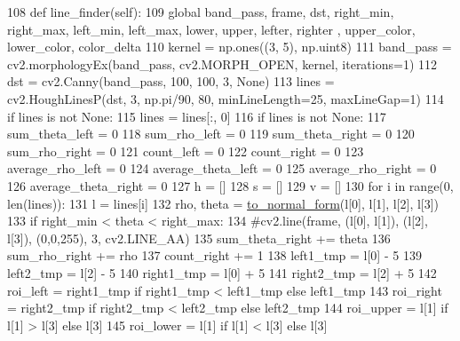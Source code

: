 \begin{DoxyCode}
108   \textcolor{keyword}{def }line\_finder(self):
109       \textcolor{keyword}{global} band\_pass, frame, dst, right\_min, right\_max, left\_min, left\_max, lower, upper, lefter, righter
      , upper\_color, lower\_color, color\_delta
110       kernel = np.ones((3, 5), np.uint8) 
111       band\_pass = cv2.morphologyEx(band\_pass, cv2.MORPH\_OPEN, kernel, iterations=1)
112       dst = cv2.Canny(band\_pass, 100, 100, 3, \textcolor{keywordtype}{None})
113       lines = cv2.HoughLinesP(dst, 3, np.pi/90, 80, minLineLength=25, maxLineGap=1)
114       \textcolor{keywordflow}{if} lines \textcolor{keywordflow}{is} \textcolor{keywordflow}{not} \textcolor{keywordtype}{None}:
115           lines = lines[:, 0]
116       \textcolor{keywordflow}{if} lines \textcolor{keywordflow}{is} \textcolor{keywordflow}{not} \textcolor{keywordtype}{None}:
117           sum\_theta\_left = 0
118           sum\_rho\_left = 0
119           sum\_theta\_right = 0
120           sum\_rho\_right = 0
121           count\_left = 0
122           count\_right = 0
123           average\_rho\_left = 0
124           average\_theta\_left = 0
125           average\_rho\_right = 0
126           average\_theta\_right = 0
127           h = []
128           s = []
129           v = []
130           \textcolor{keywordflow}{for} i \textcolor{keywordflow}{in} range(0, len(lines)):
131               l = lines[i]
132               rho, theta = \mbox{\hyperlink{namespacetoxic__vision_1_1lane__detector_ae3bdbfab97718df7c906f65d19f10dfd}{to\_normal\_form}}(l[0], l[1], l[2], l[3])
133               \textcolor{keywordflow}{if} right\_min < theta < right\_max:
134                   \textcolor{comment}{#cv2.line(frame, (l[0], l[1]), (l[2], l[3]), (0,0,255), 3, cv2.LINE\_AA)}
135                   sum\_theta\_right += theta
136                   sum\_rho\_right += rho
137                   count\_right += 1
138                   left1\_tmp = l[0] - 5
139                   left2\_tmp = l[2] - 5
140                   right1\_tmp = l[0] + 5
141                   right2\_tmp = l[2] + 5
142                   roi\_left = right1\_tmp \textcolor{keywordflow}{if} right1\_tmp < left1\_tmp \textcolor{keywordflow}{else} left1\_tmp
143                   roi\_right = right2\_tmp \textcolor{keywordflow}{if} right2\_tmp < left2\_tmp \textcolor{keywordflow}{else} left2\_tmp
144                   roi\_upper = l[1] \textcolor{keywordflow}{if} l[1] > l[3] \textcolor{keywordflow}{else} l[3]
145                   roi\_lower = l[1] \textcolor{keywordflow}{if} l[1] < l[3] \textcolor{keywordflow}{else} l[3]

\end{DoxyCode}
